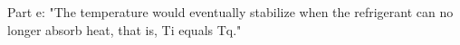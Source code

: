 Part e:
"The temperature would eventually stabilize when the refrigerant can no longer absorb heat, that is, Ti equals Tq."